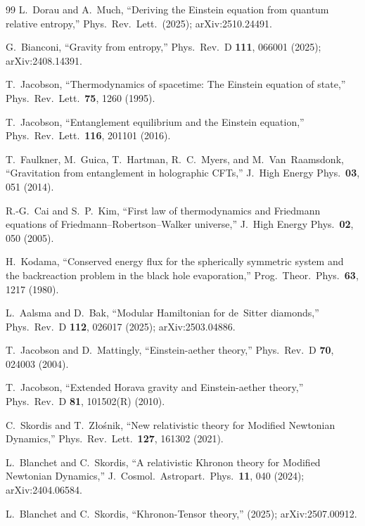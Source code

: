 \documentclass[prd,twocolumn,superscriptaddress,longbibliography,floatfix]{revtex4-2}
\begin{document}
\begin{thebibliography}{99}
L.~Dorau and A.~Much,
``Deriving the Einstein equation from quantum
relative entropy,''
Phys.\ Rev.\ Lett.\ (2025);
arXiv:2510.24491.

G.~Bianconi,
``Gravity from entropy,''
Phys.\ Rev.\ D \textbf{111}, 066001 (2025);
arXiv:2408.14391.

T.~Jacobson,
``Thermodynamics of spacetime: The Einstein equation
of state,''
Phys.\ Rev.\ Lett.\ \textbf{75}, 1260 (1995).

T.~Jacobson,
``Entanglement equilibrium and the Einstein equation,''
Phys.\ Rev.\ Lett.\ \textbf{116}, 201101 (2016).

T.~Faulkner, M.~Guica, T.~Hartman, R.~C.~Myers,
and M.~Van~Raamsdonk,
``Gravitation from entanglement in holographic CFTs,''
J.\ High Energy Phys.\ \textbf{03}, 051 (2014).

R.-G.~Cai and S.~P.~Kim,
``First law of thermodynamics and Friedmann equations
of Friedmann--Robertson--Walker universe,''
J.\ High Energy Phys.\ \textbf{02}, 050 (2005).

H.~Kodama,
``Conserved energy flux for the spherically symmetric
system and the backreaction problem in the black hole
evaporation,''
Prog.\ Theor.\ Phys.\ \textbf{63}, 1217 (1980).

L.~Aalsma and D.~Bak,
``Modular Hamiltonian for de~Sitter diamonds,''
Phys.\ Rev.\ D \textbf{112}, 026017 (2025);
arXiv:2503.04886.

T.~Jacobson and D.~Mattingly,
``Einstein-aether theory,''
Phys.\ Rev.\ D \textbf{70}, 024003 (2004).

T.~Jacobson,
``Extended Horava gravity and Einstein-aether theory,''
Phys.\ Rev.\ D \textbf{81}, 101502(R) (2010).

C.~Skordis and T.~Z\l{}o\'{s}nik,
``New relativistic theory for Modified Newtonian
Dynamics,''
Phys.\ Rev.\ Lett.\ \textbf{127}, 161302 (2021).

L.~Blanchet and C.~Skordis,
``A relativistic Khronon theory for Modified
Newtonian Dynamics,''
J.\ Cosmol.\ Astropart.\ Phys.\ \textbf{11}, 040 (2024);
arXiv:2404.06584.

L.~Blanchet and C.~Skordis,
``Khronon-Tensor theory,''
(2025); arXiv:2507.00912.


\end{thebibliography}
\end{document}
